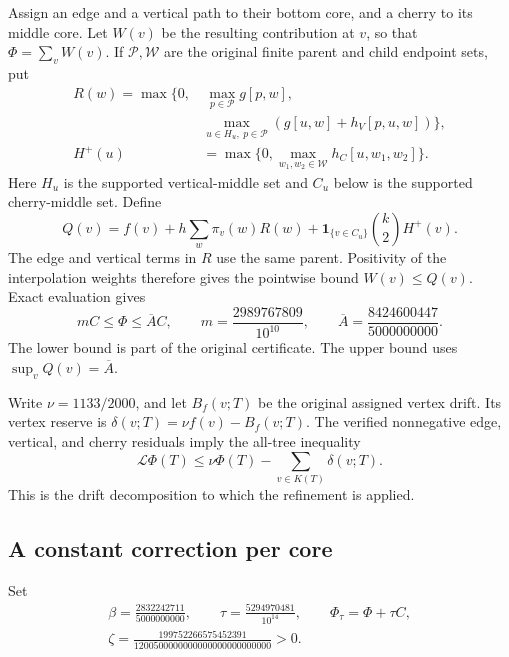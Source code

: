 Assign an edge and a vertical path to their bottom core, and a cherry
to its middle core. Let $W(v)$ be the resulting contribution at $v$,
so that $\Phi=\sum_vW(v)$. If $\mathcal P,\mathcal W$ are the original
finite parent and child endpoint sets, put
\begin{align*}
 R(w)=\max\bigl\{0,&\ \max_{p\in\mathcal P}g[p,w],\\
 &\max_{u\in H_u,\ p\in\mathcal P}
                 (g[u,w]+h_V[p,u,w])\bigr\},\\
 H^+(u)&=\max\{0,\max_{w_1,w_2\in\mathcal W}h_C[u,w_1,w_2]\}.
\end{align*}
Here $H_u$ is the supported vertical-middle set and $C_u$ below is
the supported cherry-middle set. Define
\begin{equation}\label{num:Q}
 Q(v)=f(v)+h\sum_w\pi_v(w)R(w)
       +\mathbf1_{\{v\in C_u\}}\binom{k}{2}H^+(v).
\end{equation}
The edge and vertical terms in $R$ use the same parent. Positivity of
the interpolation weights therefore gives the pointwise bound
$W(v)\le Q(v)$. Exact evaluation gives
\begin{equation}\label{num:comparison}
 m C\le\Phi\le\overline A C,
 \qquad m=\frac{2989767809}{10^{10}},
 \qquad \overline A=\frac{8424600447}{5000000000}.
\end{equation}
The lower bound is part of the original certificate. The upper bound
uses $\sup_vQ(v)=\overline A$.

Write $\nu=1133/2000$, and let $B_f(v;T)$ be the original assigned
vertex drift. Its vertex reserve is
$\delta(v;T)=\nu f(v)-B_f(v;T)$. The verified nonnegative edge,
vertical, and cherry residuals imply the all-tree inequality
\begin{equation}\label{num:original-drift}
 \mathcal L\Phi(T)\le\nu\Phi(T)-\sum_{v\in K(T)}\delta(v;T).
\end{equation}
This is the drift decomposition to which the refinement is applied.

\subsection{A constant correction per core}

Set
\begin{gather}\label{num:parameters}
 \beta=\frac{2832242711}{5000000000},\qquad
 \tau=\frac{5294970481}{10^{14}},\qquad
 \Phi_\tau=\Phi+\tau C,\\
 \zeta=\frac{199752266575452391}
              {1200500000000000000000000000}>0.
 \label{num:reserve}
\end{gather}

